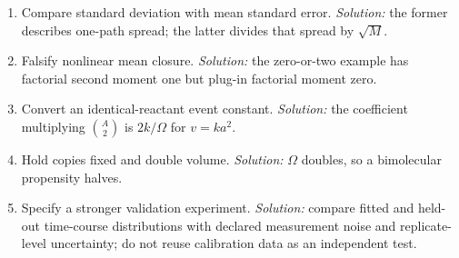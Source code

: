 \begin{enumerate}
groups have different transition probabilities before equilibrium.
\item Compare standard deviation with mean standard error. \emph{Solution:}
the former describes one-path spread; the latter divides that spread by $\sqrt M$.
\item Falsify nonlinear mean closure. \emph{Solution:} the zero-or-two example
has factorial second moment one but plug-in factorial moment zero.
\item Convert an identical-reactant event constant. \emph{Solution:}
the coefficient multiplying $\binom A2$ is $2k/\Omega$ for $v=ka^2$.
\item Hold copies fixed and double volume. \emph{Solution:} $\Omega$ doubles,
so a bimolecular propensity halves.
\item Specify a stronger validation experiment. \emph{Solution:} compare fitted
and held-out time-course distributions with declared measurement noise and
replicate-level uncertainty; do not reuse calibration data as an independent test.
\end{enumerate}
